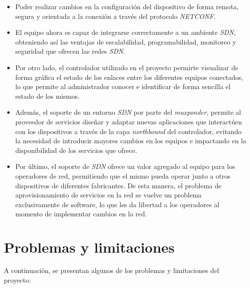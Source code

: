  \begin{itemize}

    \item Poder realizar cambios en la configuración del dispositivo de forma remota, segura y orientada a la conexión a través del protocolo \textit{NETCONF}. 
    \item El equipo ahora es capaz de integrarse correctamente a un ambiente \textit{SDN}, obteniendo así las ventajas de escalabilidad, programabilidad, monitoreo y seguridad que ofrecen las redes \textit{SDN}.
    \item Por otro lado, el controlador utilizado en el proyecto permirte visualizar de forma gráfica el estado de los enlaces entre los diferentes equipos conectados, lo que permite al administrador conocer e identificar de forma sencilla el estado de los mismos.
    \item Además, el soporte de un entorno \textit{SDN} por parte del \textit{muxponder}, permite al proveedor de servicios diseñar y adaptar nuevas aplicaciones que interactúen con los dispositivos a través de la capa \textit{northbound} del controlador, evitando la necesidad de introducir mayores cambios en los equipos e impactando en la disponibilidad de los servicios que ofrece.
    \item Por último, el soporte de \textit{SDN} ofrece un valor agregado al equipo para los operadores de red, permitiendo que el mismo pueda operar junto a otros dispositivos de diferentes fabricantes. De esta manera, el problema de aprovisionamiento de servicios en la red se vuelve un problema exclusivamente de software, lo que les da libertad a los operadores al momento de implementar cambios en la red.

\end{itemize}


\section{Problemas y limitaciones} \label{problemasylimi}

A continuación, se presentan algunos de los problemas y limitaciones del proyecto:

